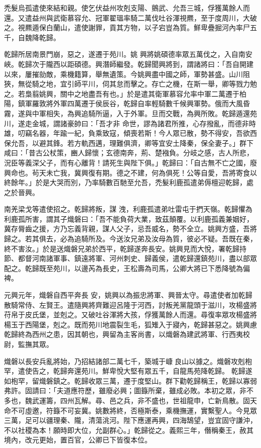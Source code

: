 \begin{pinyinscope}
 禿髮烏孤遣使來結和親。使乞伏益州攻剋支陽、鸇武、允吾三城，俘獲萬餘人而還。又遣益州與武衛慕容允、冠軍翟瑥率騎二萬伐吐谷渾視羆，至于度周川，大破之。視羆遁保白蘭山，遣使謝罪，貢其方物，以子宕豈為質。鮮卑疊掘河內率尸五千，自魏降乾歸。



 乾歸所居南景門崩，惡之，遂遷于苑川。姚
 興將姚碩德率眾五萬伐之，入自南安峽。乾歸次于隴西以距碩德。興潛師繼發。乾歸聞興將到，謂諸將曰：「吾自開建以來，屢摧勍敵，乘機籍算，舉無遺策。今姚興盡中國之師，軍勢甚盛。山川阻狹，無從騎之地，宜引師平川，伺其怠而擊之。存亡之機，在斯一舉，卿等戮力勉之。若梟翦姚興，關中之地盡吾有也。」於是遣其衛軍慕容允率中軍二萬遷于柏陽，鎮軍羅敦將外軍四萬遷于侯辰谷，乾歸自率輕騎數千候興軍勢。俄而大風昏霧，遂與中軍相失，為興追騎所逼，入于外軍。旦而交戰，為興所敗。乾歸遁還苑川，遂走金城，謂諸豪帥曰：「吾才非
 命世，謬為諸君所推，心存撥亂，而德非時雄，叨竊名器，年踰一紀，負乘致寇，傾喪若斯！今人眾已散，勢不得安，吾欲西保允吾，以避其鋒。若方軌西邁，理難俱濟，卿等宜安土降秦，保全妻子。」群下咸曰：「昔古公杖策，豳人歸懷；玄德南奔，荊、楚襁負。分岐之感，古人所悲，況臣等義深父子，而有心離背！請死生與陛下俱。」乾歸曰：「自古無不亡之國，廢興命也。茍天未亡我，冀興復有期。德之不建，何為俱死！公等自愛，吾將寄食以終餘年。」於是大哭而別，乃率騎數百馳至允吾，禿髮利鹿孤遣弟傉檀迎乾歸，處之於晉興。



 南羌梁戈等遣使招之。乾歸將叛，謀
 洩，利鹿孤遣弟吐雷屯于捫天嶺。乾歸懼為利鹿孤所害，謂其子熾磐曰：「吾不能負荷大業，致茲顛覆。以利鹿孤義兼姻好，冀存脣齒之援，方乃忘義背親，謀人父子，忌吾威名，勢不全立。姚興方盛，吾將歸之。若其俱去，必為追騎所及。今送汝兄弟及汝母為質，彼必不疑。吾既在秦，終不害汝。」於是送熾磐兄弟於西平，乾歸遂奔長安。姚興見而大悅，署乾歸持節、都督河南諸軍事、鎮遠將軍、河州刺史、歸義侯，遣乾歸還鎮苑川，盡以部眾配之。乾歸既至苑川，以邊芮為長史，王松壽為司馬，公卿大將已下悉降號為偏裨。



 元興元年，熾磐自西平奔長
 安，姚興以為振忠將軍、興晉太守。尋遣使者加乾歸散騎常侍、左賢王。遣隨興將齊難迎呂隆于河西，討叛羌黨龍頭于滋川，攻楊盛將苻帛于皮氏堡，並剋之。又破吐谷渾將大孩，俘獲萬餘人而還。尋復率眾攻楊盛將楊玉于西陽堡，剋之。既而苑川地震裂生毛，狐雉入于寢內，乾歸甚惡之。姚興慮乾歸終為西州之患，因其朝也，興留為主客尚書，以熾磐為建武將軍、行西夷校尉，監撫其眾。



 熾磐以長安兵亂將始，乃招結諸部二萬七千，築城于嵻良山以據之。熾磐攻剋枹罕，遣使告之，乾歸奔還苑川。鮮卑悅大堅有眾五千，自龍馬苑降乾歸。
 乾歸遂如枹罕，留熾磐鎮之。乾歸收眾三萬，遷于度堅山。群下勸乾歸稱王，乾歸以寡弱弗許。固請曰：「夫道應符歷，雖廢必興；圖籙所棄，雖成必敗。本初之眾，非不多也，魏武運籌，四州瓦解。尋、邑之兵，非不盛也，世祖龍申，亡新鳥散。固天命不可虛邀，符籙不可妄冀。姚數將終，否極斯泰，乘機撫運，實繫聖人。今見眾三萬，足可以疆理秦、隴，清蕩洮河。陛下應運再興，四海鵠望，豈宜固守謙沖，不以社稷為本！願時即大位，允副群心。」乾歸從之。義熙三年，僭稱秦王，赦其境內，改元更始，置百官，公卿已下皆復本位。




\end{pinyinscope}

